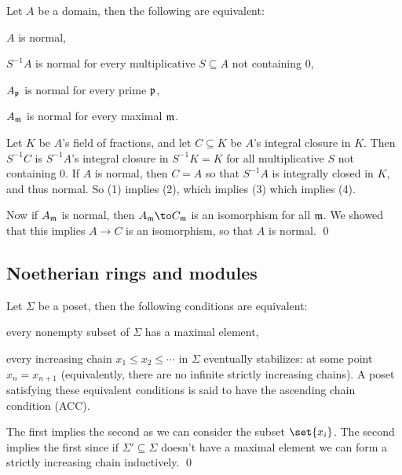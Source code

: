 \eproof

\bcoro

    Let $A$ be a domain, then the following are equivalent:
    \benum
        \item $A$ is normal,
        \item $S^{-1}A$ is normal for every multiplicative $S\subseteq A$ not containing $0$,
        \item $A_{{\frak p}}$ is normal for every prime ${{\frak p}}$,
        \item $A_{{\frak m}}$ is normal for every maximal ${{\frak m}}$.
    \eenum

\ecoro

\bproof

    Let $K$ be $A$'s field of fractions, and let $C\subseteq K$ be $A$'s integral closure in $K$.
    Then $S^{-1}C$ is $S^{-1}A$'s integral closure in $S^{-1}K=K$ for all multiplicative $S$ not containing $0$.
    If $A$ is normal, then $C=A$ so that $S^{-1}A$ is integrally closed in $K$, and thus normal.
    So (1) implies (2), which implies (3) which implies (4).

    Now if $A_{{\frak m}}$ is normal, then $A_\m\to C_\m$ is an isomorphism for all ${{\frak m}}$.
    We showed that this implies $A\to C$ is an isomorphism, so that $A$ is normal.
    \qed

\eproof

\subsection{Noetherian rings and modules}

\blemm

    Let $\Sigma$ be a poset, then the following conditions are equivalent:
    \benum
        \item every nonempty subset of $\Sigma$ has a maximal element,
        \item every increasing chain $x_1\leq x_2\leq\cdots$ in $\Sigma$ eventually stabilizes: at some point $x_n=x_{n+1}$ (equivalently, there are no infinite strictly
        increasing chains).
    \eenum
    A poset satisfying these equivalent conditions is said to have the {\emphcolor ascending chain condition} ({\emphcolor ACC}).

\elemm

\bproof

    The first implies the second as we can consider the subset $\set{x_i}$.
    The second implies the first since if $\Sigma'\subseteq\Sigma$ doesn't have a maximal element we can form a strictly increasing chain inductively.
    \qed

